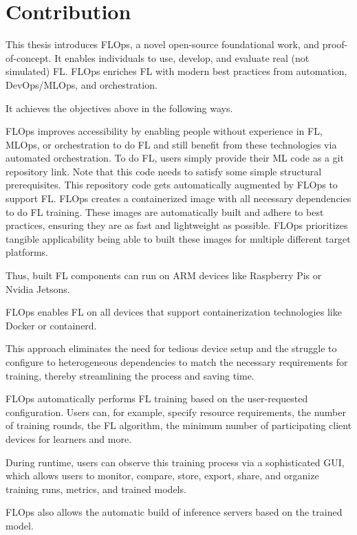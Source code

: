 
\section{Contribution}

This thesis introduces FLOps, a novel open-source foundational work, and proof-of-concept.
It enables individuals to use, develop, and evaluate real (not simulated) FL.
FLOps enriches FL with modern best practices from automation, DevOps/MLOps, and orchestration.

It achieves the objectives above in the following ways.

FLOps improves accessibility by enabling people without experience in
FL, MLOps, or orchestration to do FL and still benefit from these technologies via automated orchestration.
To do FL, users simply provide their ML code as a git repository link.
Note that this code needs to satisfy some simple structural prerequisites.
This repository code gets automatically augmented by FLOps to support FL.
FLOps creates a containerized image with all necessary dependencies to do FL training.
These images are automatically built and adhere to best practices, ensuring they are
as fast and lightweight as possible.
FLOps prioritizes tangible applicability being able to built these images
for multiple different target platforms.

Thus, built FL components can run on ARM devices like Raspberry Pis or Nvidia Jetsons.

FLOps enables FL on all devices that support containerization technologies like Docker or containerd.

This approach eliminates the need for tedious device setup and the struggle to configure to
heterogeneous dependencies to match the necessary requirements for training, thereby streamlining the
process and saving time.

FLOps automatically performs FL training based on the user-requested configuration.
Users can, for example, specify resource requirements, the number of training rounds, the FL algorithm,
the minimum number of participating client devices for learners and more.

During runtime, users can observe this training process via a sophisticated GUI,
which allows users to monitor, compare, store, export, share, and organize training runs,
metrics, and trained models.

FLOps also allows the automatic build of inference servers based on the trained model.


